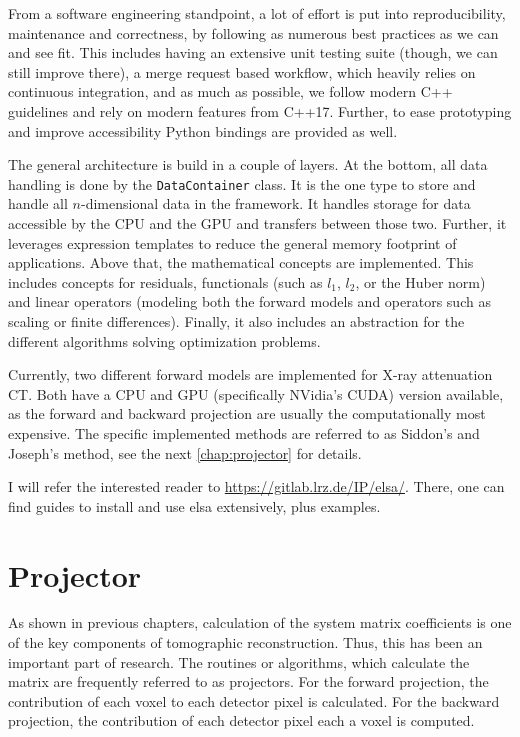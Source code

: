 From a software engineering standpoint, a lot of effort is put into reproducibility, maintenance and
correctness, by following as numerous best practices as we can and see fit. This includes
having an extensive unit testing suite (though, we can still improve there), a merge request based
workflow, which heavily relies on continuous integration, and as much as possible, we follow modern
C++ guidelines and rely on modern features from C++17. Further, to ease prototyping and improve
accessibility Python bindings are provided as well.

The general architecture is build in a couple of layers. At the bottom, all data handling is done
by the \texttt{DataContainer} class. It is the one type to store and handle all
\(n\)-dimensional data in the framework. It handles storage for data accessible by the \gls{CPU} and
the \gls{GPU} and transfers between those two. Further, it leverages expression templates to reduce
the general memory footprint of applications. Above that, the mathematical concepts are implemented.
This includes concepts for residuals, functionals (such as \(l_1\), \(l_2\), or the Huber norm) and
linear operators (modeling both the forward models and operators such as scaling or finite
differences). Finally, it also includes an abstraction for the different algorithms solving
optimization problems.

Currently, two different forward models are implemented for X-ray attenuation CT. Both have a
\gls{CPU} and \gls{GPU} (specifically NVidia's CUDA) version available, as the forward and backward
projection are usually the computationally most expensive. The specific implemented methods are
referred to as Siddon's and Joseph's method, see the next \autoref{chap:projector} for details.

I will refer the interested reader to
\href{https://gitlab.lrz.de/IP/elsa/}{https://gitlab.lrz.de/IP/elsa/}. There, one can find guides to
install and use elsa extensively, plus examples.

\chapter{Projector}\label{chap:projector}

As shown in previous chapters, calculation of the system matrix coefficients is one of the key
components of tomographic reconstruction. Thus, this has been an important part of research. The
routines or algorithms, which calculate the matrix are frequently referred to as projectors. For the
forward projection, the contribution of each voxel to each detector pixel is calculated. For the
backward projection, the contribution of each detector pixel each a voxel is computed.

